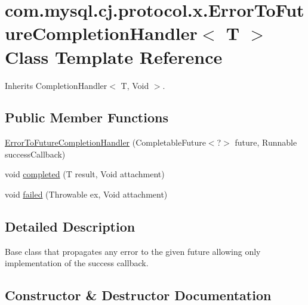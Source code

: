 \hypertarget{classcom_1_1mysql_1_1cj_1_1protocol_1_1x_1_1_error_to_future_completion_handler}{}\section{com.\+mysql.\+cj.\+protocol.\+x.\+Error\+To\+Future\+Completion\+Handler$<$ T $>$ Class Template Reference}
\label{classcom_1_1mysql_1_1cj_1_1protocol_1_1x_1_1_error_to_future_completion_handler}


Inherits Completion\+Handler$<$ T, Void $>$.

\subsection*{Public Member Functions}
\begin{DoxyCompactItemize}
\item 
\mbox{\hyperlink{classcom_1_1mysql_1_1cj_1_1protocol_1_1x_1_1_error_to_future_completion_handler_a8cc938c3d98024b23ca6466064e6f13f}{Error\+To\+Future\+Completion\+Handler}} (Completable\+Future$<$?$>$ future, Runnable success\+Callback)
\item 
void \mbox{\hyperlink{classcom_1_1mysql_1_1cj_1_1protocol_1_1x_1_1_error_to_future_completion_handler_adeccf1e0e505f757456485c7773f72fc}{completed}} (T result, Void attachment)
\item 
void \mbox{\hyperlink{classcom_1_1mysql_1_1cj_1_1protocol_1_1x_1_1_error_to_future_completion_handler_a2fd335c55b05e10109894b888d27c5df}{failed}} (Throwable ex, Void attachment)
\end{DoxyCompactItemize}


\subsection{Detailed Description}
Base class that propagates any error to the given future allowing only implementation of the success callback. 

\subsection{Constructor \& Destructor Documentation}
\mbox{\label{classcom_1_1mysql_1_1cj_1_1protocol_1_1x_1_1_error_to_future_completion_handler_a8cc938c3d98024b23ca6466064e6f13f}} 

